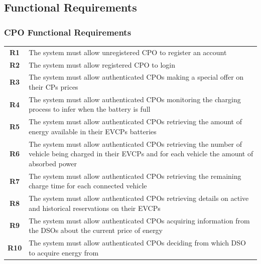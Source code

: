 \subsection{Functional Requirements}


\subsubsection{CPO Functional Requirements}
\begin{table}[H]
    \begin{tabularx}{\textwidth}{cX}
        \toprule
        \textbf{R1}  & The system must allow unregistered CPO to register an account                                                                                            \\
        \textbf{R2}  & The system must allow registered CPO to login                                                                                                            \\
        \textbf{R3}  & The system must allow authenticated CPOs making a special offer on their CPs prices                                                                      \\
        \textbf{R4}  & The system must allow authenticated CPOs monitoring the charging process to infer when the battery is full                                               \\
        \textbf{R5}  & The system must allow authenticated CPOs retrieving the amount of energy available in their EVCPs batteries                                              \\
        \textbf{R6}  & The system must allow authenticated CPOs retrieving the number of vehicle being charged in their EVCPs and for each vehicle the amount of absorbed power \\
        \textbf{R7}  & The system must allow authenticated CPOs retrieving the remaining charge time for each connected vehicle                                                 \\
        \textbf{R8}  & The system must allow authenticated CPOs retrieving details on active and historical reservations on their EVCPs                                         \\
        \textbf{R9}  & The system must allow authenticated CPOs acquiring information from the DSOs about the current price of energy                                           \\
        \textbf{R10} & The system must allow authenticated CPOs deciding from which DSO to acquire energy from                                                                  \\

\end{tabularx}
\end{table}
